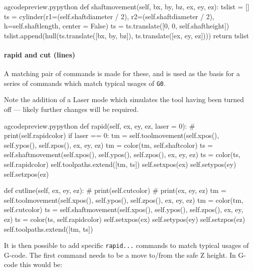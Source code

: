 \documentclass{ltxdoc}
\begin{document}
\lstset{firstnumber=\thegcpy}
\begin{writecode}{a}{gcodepreview.py}{python}
    def shaftmovement(self, bx, by, bz, ex, ey, ez):
        tslist = []
        ts = cylinder(r1=(self.shaftdiameter / 2), r2=(self.shaftdiameter / 2), h=self.shaftlength, center = False)
        ts = ts.translate([0, 0, self.shaftheight])
        tslist.append(hull(ts.translate([bx, by, bz]), ts.translate([ex, ey, ez])))
        return tslist

\end{writecode}
\addtocounter{gcpy}{7}

\paragraph{rapid and cut (lines)}

A matching pair of commands is made for these, and  is used as the basis for a series of commands which match typical usages of \verb|G0|.

Note the addition of a Laser mode which simulates the tool having been turned off --- likely further changes will be required.

\lstset{firstnumber=\thegcpy}
\begin{writecode}{a}{gcodepreview.py}{python}
    def rapid(self, ex, ey, ez, laser = 0):
#        print(self.rapidcolor)
        if laser == 0:
            tm = self.toolmovement(self.xpos(), self.ypos(), self.zpos(), ex, ey, ez)
            tm = color(tm, self.shaftcolor)
            ts = self.shaftmovement(self.xpos(), self.ypos(), self.zpos(), ex, ey, ez)
            ts = color(ts, self.rapidcolor)
            self.toolpaths.extend([tm, ts])
        self.setxpos(ex)
        self.setypos(ey)
        self.setzpos(ez)

    def cutline(self, ex, ey, ez):
#        print(self.cutcolor)
#        print(ex, ey, ez)
        tm = self.toolmovement(self.xpos(), self.ypos(), self.zpos(), ex, ey, ez)
        tm = color(tm, self.cutcolor)
        ts = self.shaftmovement(self.xpos(), self.ypos(), self.zpos(), ex, ey, ez)
        ts = color(ts, self.rapidcolor)
        self.setxpos(ex)
        self.setypos(ey)
        self.setzpos(ez)
        self.toolpaths.extend([tm, ts])

\end{writecode}
\addtocounter{gcpy}{24}

It is then possible to add specific \verb|rapid...| commands to match typical usages of G-code. The first command needs to be a move to/from the safe Z height. In G-code this would be:
\end{document}
